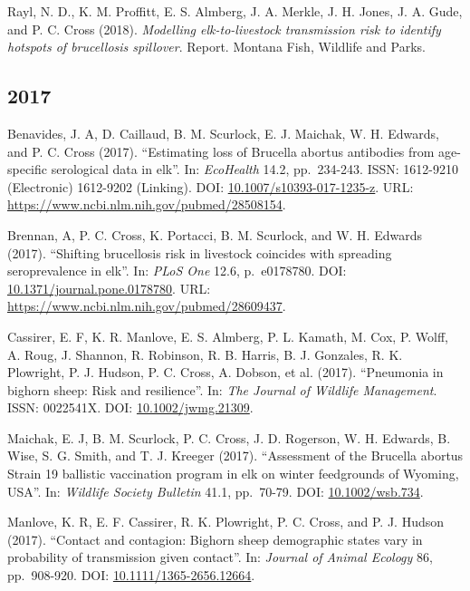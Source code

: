 \documentclass[12pt,]{article}
\begin{document}
Rayl, N. D., K. M. Proffitt, E. S. Almberg, J. A. Merkle, J. H. Jones,
J. A. Gude, and P. C. Cross (2018). \emph{Modelling elk-to-livestock
transmission risk to identify hotspots of brucellosis spillover}.
Report. Montana Fish, Wildlife and Parks.

\hypertarget{section-2}{%
\subsection{2017}\label{section-2}}

Benavides, J. A, D. Caillaud, B. M. Scurlock, E. J. Maichak, W. H.
Edwards, and P. C. Cross (2017). ``Estimating loss of Brucella abortus
antibodies from age-specific serological data in elk''. In:
\emph{EcoHealth} 14.2, pp.~234-243. ISSN: 1612-9210 (Electronic)
1612-9202 (Linking). DOI:
\href{https://doi.org/10.1007\%2Fs10393-017-1235-z}{10.1007/s10393-017-1235-z}.
URL: \url{https://www.ncbi.nlm.nih.gov/pubmed/28508154}.

Brennan, A, P. C. Cross, K. Portacci, B. M. Scurlock, and W. H. Edwards
(2017). ``Shifting brucellosis risk in livestock coincides with
spreading seroprevalence in elk''. In: \emph{PLoS One} 12.6,
p.~e0178780. DOI:
\href{https://doi.org/10.1371\%2Fjournal.pone.0178780}{10.1371/journal.pone.0178780}.
URL: \url{https://www.ncbi.nlm.nih.gov/pubmed/28609437}.

Cassirer, E. F, K. R. Manlove, E. S. Almberg, P. L. Kamath, M. Cox, P.
Wolff, A. Roug, J. Shannon, R. Robinson, R. B. Harris, B. J. Gonzales,
R. K. Plowright, P. J. Hudson, P. C. Cross, A. Dobson, et al. (2017).
``Pneumonia in bighorn sheep: Risk and resilience''. In: \emph{The
Journal of Wildlife Management}. ISSN: 0022541X. DOI:
\href{https://doi.org/10.1002\%2Fjwmg.21309}{10.1002/jwmg.21309}.

Maichak, E. J, B. M. Scurlock, P. C. Cross, J. D. Rogerson, W. H.
Edwards, B. Wise, S. G. Smith, and T. J. Kreeger (2017). ``Assessment of
the Brucella abortus Strain 19 ballistic vaccination program in elk on
winter feedgrounds of Wyoming, USA''. In: \emph{Wildlife Society
Bulletin} 41.1, pp.~70-79. DOI:
\href{https://doi.org/10.1002\%2Fwsb.734}{10.1002/wsb.734}.

Manlove, K. R, E. F. Cassirer, R. K. Plowright, P. C. Cross, and P. J.
Hudson (2017). ``Contact and contagion: Bighorn sheep demographic states
vary in probability of transmission given contact''. In: \emph{Journal
of Animal Ecology} 86, pp.~908-920. DOI:
\href{https://doi.org/10.1111\%2F1365-2656.12664}{10.1111/1365-2656.12664}.
\end{document}

